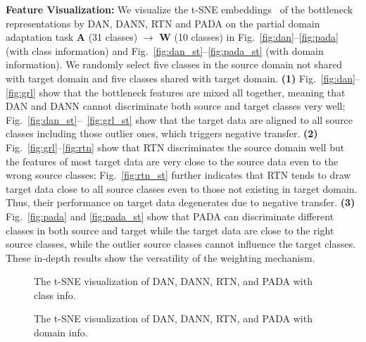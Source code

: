 \documentclass[runningheads]{llncs}
\begin{document}
\textbf{Feature Visualization:} We visualize the t-SNE embeddings~\cite{cite:ICML14DeCAF} of the bottleneck representations by DAN, DANN, RTN and PADA on the partial domain adaptation task \textbf{A} (31 classes) $\rightarrow$ \textbf{W} (10 classes) in Fig.~\ref{fig:dan}--\ref{fig:pada} (with class information) and Fig.~\ref{fig:dan_st}--\ref{fig:pada_st} (with domain information). We randomly select five classes in the source domain not shared with target domain and five classes shared with target domain. \textbf{(1)} Fig.~\ref{fig:dan}--\ref{fig:grl} show that the bottleneck features are mixed all together, meaning that DAN and DANN cannot discriminate both source and target classes very well; Fig.~\ref{fig:dan_st}--~\ref{fig:grl_st} show that the target data are aligned to all source classes including those outlier ones, which triggers negative transfer. \textbf{(2)} Fig.~\ref{fig:grl}--\ref{fig:rtn} show that RTN discriminates the source domain well but the features of most target data are very close to the source data even to the wrong source classes; Fig.~\ref{fig:rtn_st} further indicates that RTN tends to draw target data close to all source classes even to those not existing in target domain. Thus, their performance on target data degenerates due to negative transfer. 
\textbf{(3)} Fig.~\ref{fig:pada} and \ref{fig:pada_st} show that PADA can discriminate different classes in both source and target while the target data are close to the right source classes, while the outlier source classes cannot influence the target classes. These in-depth results show the versatility of the weighting mechanism. 

\begin{figure}[htbp]
  \centering
  \hfil
  \hfil
  \hfil
  \caption{The t-SNE visualization of DAN, DANN, RTN, and PADA with class info.}
\end{figure}

\begin{figure}[htbp]
  \centering
  \hfil
  \hfil
  \hfil
  \caption{The t-SNE visualization of DAN, DANN, RTN, and PADA with domain info.}
\end{figure}
\end{document}
